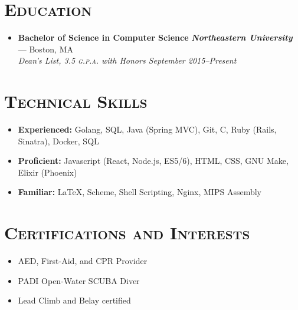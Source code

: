 \documentclass{article}
\begin{document}
\section*{\textsc{Education}}
\begin{itemize}[label={},leftmargin=*]
\item \textbf{Bachelor of Science in Computer Science} \hfill \textit{\textbf{Northeastern University}} --- Boston, MA \\ \em{Dean's List}, 3.5 \textsc{g.p.a.} with Honors \hfill {\em September 2015--Present}
\end{itemize}

\section*{\textsc{Technical Skills}}
\begin{itemize}[label={},leftmargin=*]
\item \textbf{Experienced:} Golang, SQL, Java (Spring MVC), Git,  C, Ruby (Rails, Sinatra), Docker, SQL
\item \textbf{Proficient:} Javascript (React, Node.js, ES5/6), HTML, CSS, GNU Make, Elixir (Phoenix)
\item \textbf{Familiar:} LaTeX, Scheme, Shell Scripting, Nginx, MIPS Assembly
\end{itemize}


\section*{\textsc{Certifications and Interests}}
\begin{multicols}{2}
  \begin{itemize}[label={$\bullet$}]
  \item AED, First-Aid, and CPR Provider
  \item PADI Open-Water SCUBA Diver
  \item Lead Climb and Belay certified
  \end{itemize}
\end{multicols}
\end{document}
